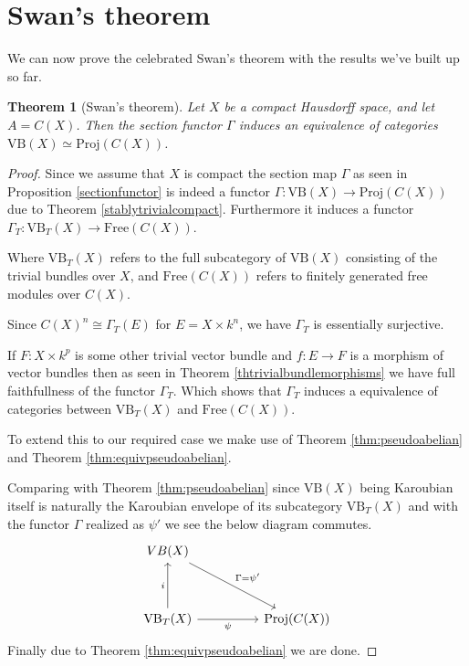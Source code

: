 \documentclass[12pt]{report}
\numberwithin{equation}{section}
\newtheorem{theorem}[dummy]{Theorem}
\begin{document}
	

	\section{Swan's theorem}
	
	We can now prove the celebrated Swan's theorem with the results we've built up so far.
	\begin{theorem}[Swan's theorem]\label{thm:serreswan}
		Let $X$ be a compact Hausdorff space, and let $A = C(X)$. Then the section functor $\Gamma$ induces an equivalence of categories $\mathrm{VB}(X) \simeq \mathrm{Proj}(C(X))$.
	\end{theorem}
	
	\begin{proof}
		Since we assume that $X$ is compact the section map $\Gamma$ as seen in Proposition \ref{sectionfunctor} is indeed a functor $\Gamma: \mathrm{VB}(X) \to \mathrm{Proj}(C(X))$ due to Theorem \ref{stablytrivialcompact}. Furthermore it induces a functor $\Gamma_T: \mathrm{VB}_{T}(X) \to \mathrm{Free}(C(X))$.
		
		Where $\mathrm{VB}_T(X)$ refers to the full subcategory of $\mathrm{VB}(X)$ consisting of the trivial bundles over $X$, and $\mathrm{Free}(C(X))$ refers to finitely generated free modules over $C(X)$.
		
		Since $C(X)^n \cong \Gamma_T(E)$ for $E=X\times k^n$, we have $\Gamma_T$ is essentially surjective.
		
		If $F:X \times k^p$ is some other trivial vector bundle and $f:E \to F$ is a morphism of vector bundles then as seen in Theorem \ref{thtrivialbundlemorphisms} we have full faithfullness of the functor $\Gamma_T$. Which shows that $\Gamma_T$ induces a equivalence of categories between $\mathrm{VB}_T(X) $ and $\mathrm{Free}(C(X))$.
		
		To extend this to our required case we make use of Theorem \ref{thm:pseudoabelian} and Theorem \ref{thm:equivpseudoabelian}.
		
		Comparing with Theorem \ref{thm:pseudoabelian} since $\mathrm{VB}(X)$ being Karoubian itself is naturally the Karoubian envelope of its subcategory $\mathrm{VB}_T(X)$ and with the functor $\Gamma$ realized as $\psi'$ we see the below diagram commutes.
		\[\begin{tikzcd}
			{VB(X)} \\
			\\
			{\mathrm{VB}_T(X)} && {\mathrm{Proj}(C(X))}
			\arrow["{\Gamma =\psi'}", from=1-1, to=3-3]
			\arrow["i", from=3-1, to=1-1]
			\arrow["\psi"', from=3-1, to=3-3]
		\end{tikzcd}\]
		Finally due to Theorem \ref{thm:equivpseudoabelian} we are done.
		

\end{proof}
\end{document}
